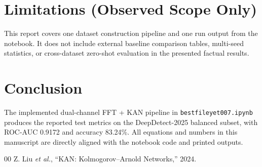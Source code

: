 \documentclass[conference]{IEEEtran}
\begin{document}
\section{Limitations (Observed Scope Only)}
This report covers one dataset construction pipeline and one run output from the notebook. It does not include external baseline comparison tables, multi-seed statistics, or cross-dataset zero-shot evaluation in the presented factual results.

\section{Conclusion}
The implemented dual-channel FFT + KAN pipeline in \texttt{bestfileyet007.ipynb} produces the reported test metrics on the DeepDetect-2025 balanced subset, with ROC-AUC 0.9172 and accuracy 83.24\%. All equations and numbers in this manuscript are directly aligned with the notebook code and printed outputs.

\begin{thebibliography}{00}
 Z. Liu \emph{et al.}, ``KAN: Kolmogorov--Arnold Networks,'' 2024.
\end{thebibliography}
\end{document}
